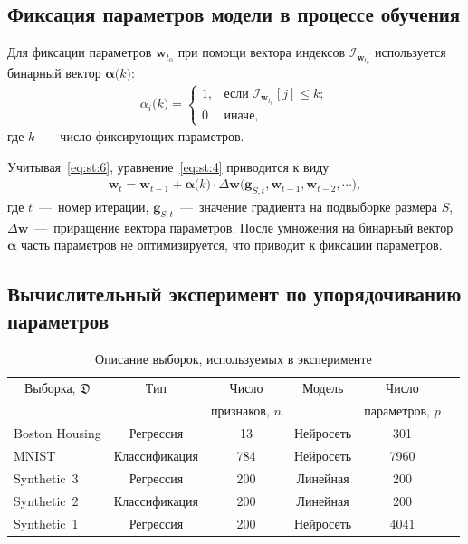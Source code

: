 \subsection{Фиксация параметров модели в процессе обучения}
Для фиксации параметров $\textbf{w}_{t_0}$ при помощи вектора индексов $\mathcal{I}_{\textbf{w}_{t_0}}$ используется бинарный вектор $\bm{\alpha}\bigr(k\bigr)$:
\[
\label{eq:st:6}
\begin{aligned}
\alpha_i\bigr(k\bigr) = \begin{cases}
   1, &\text{если }\mathcal{I}_{\textbf{w}_{t_0}}[j] \leq k;\\
   0 &\text{иначе},
 \end{cases}
\end{aligned}
\]
 где $k$~---~число фиксирующих параметров.
 
 Учитывая~\eqref{eq:st:6}, уравнение~\eqref{eq:st:4} приводится к виду
 \[
\label{eq:st:7}
\begin{aligned}
\textbf{w}_{t} = \textbf{w}_{t-1} + \bm{\alpha}\bigr(k\bigr)\cdot\Delta\textbf{w}\bigr(\textbf{g}_{S,t}, \textbf{w}_{t-1}, \textbf{w}_{t-2}, \cdots\bigr),
\end{aligned}
\]
где $t$~---~номер итерации, $\textbf{g}_{S,t}$~---~значение градиента на подвыборке размера $S$, $\Delta\textbf{w}$~---~приращение вектора параметров. После умножения на бинарный вектор $\bm\alpha$ часть параметров не оптимизируется, что приводит к фиксации параметров.

\subsection{Вычислительный эксперимент по упорядочиванию параметров}

\begin{table}[h!t]
\begin{center}
\caption{Описание выборок, используемых в эксперименте}
\label{tb:ex:1}
\begin{tabular}{|c|c|c|c|c|c|}
\hline
	Выборка, $\mathfrak{D}$& Тип & Число& Модель& Число \\
	&& признаков, $n$&&параметров, $p$\\
	\hline
	\multicolumn{1}{|l|}{Boston Housing}&
	Регрессия& 13& Нейросеть& 301\\
	\hline
	\multicolumn{1}{|l|}{MNIST}&
	Классификация& 784& Нейросеть& 7960\\
	\hline
	\multicolumn{1}{|l|}{Synthetic~3}&
	Регрессия& 200& Линейная& 200\\
	\hline
	\multicolumn{1}{|l|}{Synthetic~2}&
	Классификация& 200& Линейная& 200\\
	\hline
	\multicolumn{1}{|l|}{Synthetic~1}&
	Регрессия& 200& Нейросеть& 4041\\
\hline

\end{tabular}
\end{center}
\end{table}

